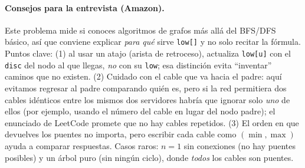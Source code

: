 \paragraph{Consejos para la entrevista (Amazon).} Este problema mide si
conoces algoritmos de grafos más allá del BFS/DFS básico, así que conviene
explicar \emph{para qué} sirve \texttt{low[]} y no solo recitar la fórmula.
Puntos clave: (1) al usar un atajo (arista de retroceso), actualiza
\texttt{low[u]} con el \texttt{disc} del nodo al que llegas, \emph{no} con su
\texttt{low}; esa distinción evita ``inventar'' caminos que no existen. (2)
Cuidado con el cable que va hacia el padre: aquí evitamos regresar al padre
comparando quién es, pero si la red permitiera dos cables idénticos entre los
mismos dos servidores habría que ignorar solo \emph{uno} de ellos (por
ejemplo, usando el número del cable en lugar del nodo padre); el enunciado de
LeetCode promete que no hay cables repetidos. (3) El orden en que devuelves
los puentes no importa, pero escribir cada cable como $(\min, \max)$ ayuda a
comparar respuestas. Casos raros: $n=1$ sin conexiones (no hay puentes
posibles) y un árbol puro (sin ningún ciclo), donde \emph{todos} los cables
son puentes.
